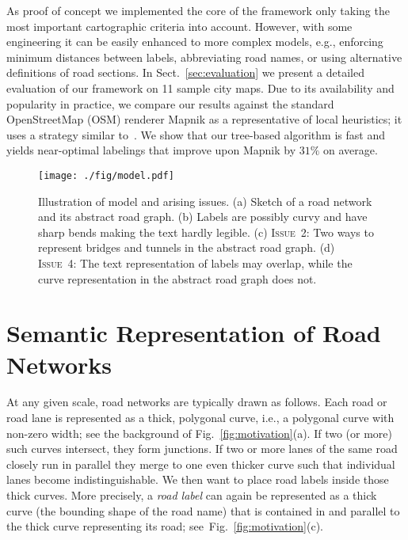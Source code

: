 \documentclass[a4paper,11pt]{article}
\newcommand{\ICrossings}{\textsc{Issue~2}\xspace}
\newcommand{\IFatLabels}{\textsc{Issue~4}\xspace}
\begin{document}
 As proof of concept we implemented the core of the framework only taking 
    the most important cartographic criteria into account. However, with
   some engineering it can be easily enhanced to more complex models,
   e.g., enforcing minimum distances between labels, abbreviating road names, or using alternative definitions of road sections.  In
 Sect.~\ref{sec:evaluation} we present a detailed evaluation of our
 framework on 11 sample city maps.  Due to its availability and
 popularity in practice, we compare our results against the standard
 OpenStreetMap (OSM) renderer Mapnik as a representative of local
 heuristics; it uses a strategy similar
 to~\cite{street-name-placement,strijk2001}. We show that our
 tree-based algorithm is fast and yields near-optimal labelings that
 improve upon Mapnik by $31\%$ on average. 





\begin{figure}[htb]
\centering
\texttt{[image: ./fig/model.pdf]}
\caption{Illustration of model and arising issues. (a) Sketch of a road network and its abstract road graph.  (b) Labels are possibly curvy and have sharp bends making the text hardly legible. (c) \ICrossings: Two ways to represent bridges and tunnels in the abstract road graph. (d) \IFatLabels: The text representation of labels  may overlap, while the curve representation in the abstract road graph does not.}
\label{fig:model-issues}
\end{figure}


\section{Semantic Representation of Road Networks}\label{sec:model}




At any given scale, road networks are typically drawn as follows. Each
road or road lane is represented as a thick, polygonal curve, i.e.,
a polygonal curve with non-zero width; see the background of Fig.~\ref{fig:motivation}(a). If two (or more) such curves intersect, they form
junctions. If two or more lanes of the same road closely run in parallel they merge to one even
thicker curve such that individual lanes become indistinguishable.  We
then want to place road labels inside those thick curves. More
precisely, a \emph{road label} can again be represented as a thick
curve (the bounding shape of the road name) that is contained in and
parallel to the thick curve representing its road; see~Fig.~\ref{fig:motivation}(c).
\end{document}
